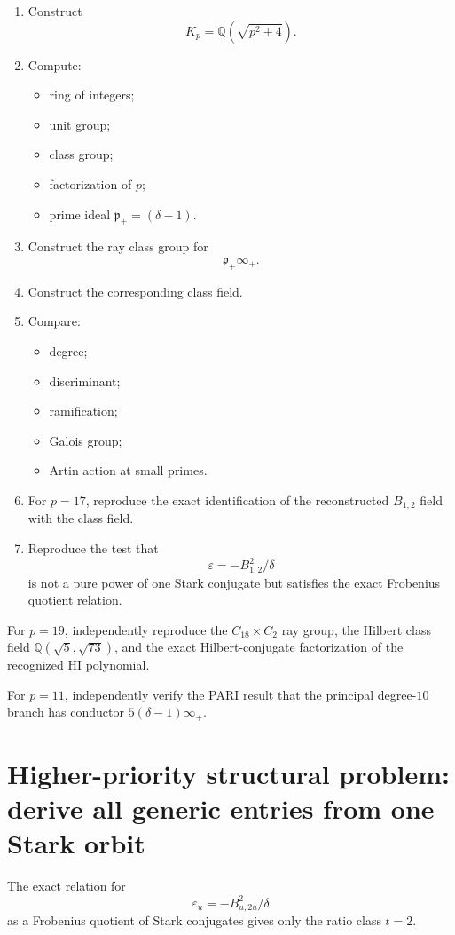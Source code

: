 \documentclass[11pt,reqno]{amsart}
\theoremstyle{plain}
\begin{document}
\begin{enumerate}
\item Construct
\[
 K_p=\mathbb Q(\sqrt{p^2+4}).
\]
\item Compute:
\begin{itemize}
\item ring of integers;
\item unit group;
\item class group;
\item factorization of \(p\);
\item prime ideal \(\mathfrak p_+=(\delta-1)\).
\end{itemize}
\item Construct the ray class group for
\[
 \mathfrak p_+\infty_+.
\]
\item Construct the corresponding class field.
\item Compare:
\begin{itemize}
\item degree;
\item discriminant;
\item ramification;
\item Galois group;
\item Artin action at small primes.
\end{itemize}
\item For \(p=17\), reproduce the exact identification of the reconstructed \(B_{1,2}\) field with the class field.
\item Reproduce the test that
\[
 \varepsilon=-B_{1,2}^2/\delta
\]
is not a pure power of one Stark conjugate but satisfies the exact Frobenius quotient relation.
\end{enumerate}

For \(p=19\), independently reproduce the \(C_{18}\times C_2\) ray group, the Hilbert class field \(\mathbb Q(\sqrt5,\sqrt{73})\), and the exact Hilbert-conjugate factorization of the recognized HI polynomial.

For \(p=11\), independently verify the PARI result that the principal degree-\(10\) branch has conductor \(5(\delta-1)\infty_+\).

\section{Higher-priority structural problem: derive all generic entries from one Stark orbit}\label{sec:14}

The exact relation for
\[
\varepsilon_u=-B_{u,2u}^2/\delta
\]
as a Frobenius quotient of Stark conjugates gives only the ratio class \(t=2\).
\end{document}
